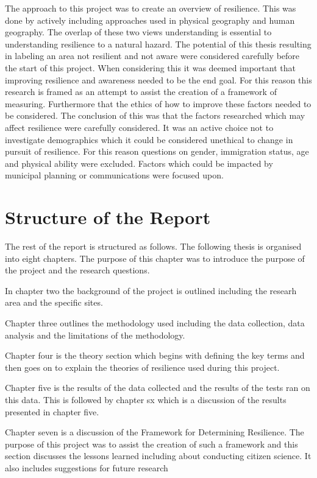The approach to this project was to create an overview of resilience. This was done by actively including approaches used in physical geography and human geography. The overlap of these two views understanding is essential to understanding resilience to a natural hazard. The potential of this thesis resulting in labeling an area not resilient and not aware were considered carefully before the start of this project. When considering this it was deemed important that improving resilience and awareness needed to be the end goal. For this reason this research is framed as an attempt to assist the creation of a framework of measuring. Furthermore that the ethics of how to improve these factors needed to be considered. The conclusion of this was that the factors researched which may affect resilience were carefully considered. It was an active choice not to investigate demographics which it could be considered unethical to change in pursuit of resilience. For this reason questions on gender, immigration status, age and physical ability were excluded. Factors which could be impacted by municipal planning or communications were focused upon. 


\section{Structure of the Report}
The rest of the report is structured as follows. 
The following thesis is organised into eight chapters. The purpose of this chapter was to introduce the purpose of the project and the research questions.

In chapter two the background of the project is outlined including the researh area and the specific sites. 

Chapter three outlines the methodology used including the data collection, data analysis and the limitations of the methodology.

Chapter four is the theory section which begins with defining the key terms and then goes on to explain the theories of resilience used during this project.

Chapter five is the results of the data collected and the results of the tests ran on this data. This is followed by chapter sx which is a discussion of the results presented in chapter five. 

Chapter seven is a discussion of the Framework for Determining Resilience. The purpose of this project was to assist the creation of such a framework and this section discusses the lessons learned including about conducting citizen science. It also includes suggestions for future research

